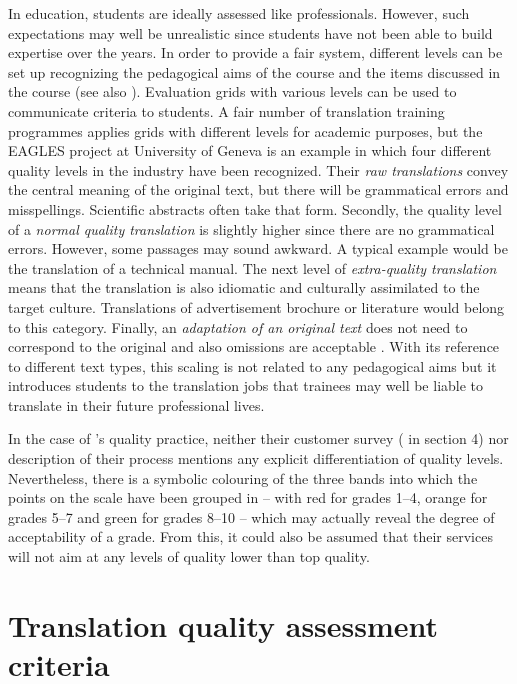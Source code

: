 \documentclass[output=paper]{langsci/langscibook}
\begin{document}
In education, students are ideally assessed like professionals. However, such expectations may well be unrealistic since students have not been able to build expertise over the years. In order to provide a fair system, different levels can be set up recognizing the pedagogical aims of the course and the items discussed in the course (see also \citealt{Vandepitteforthcoming}). Evaluation grids with various levels can be used to communicate criteria to students. A fair number of translation training programmes applies grids with different levels for academic purposes, but the EAGLES project at University of Geneva is an example in which four different quality levels in the industry have been recognized. Their \textit{raw translations} convey the central meaning of the original text, but there will be grammatical errors and misspellings. Scientific abstracts often take that form. Secondly, the quality level of a \textit{normal quality translation} is slightly higher since there are no grammatical errors. However, some passages may sound awkward. A typical example would be the translation of a technical manual. The next level of \textit{extra-quality translation} means that the translation is also idiomatic and culturally assimilated to the target culture. Translations of advertisement brochure or literature would belong to this category. Finally, an \textit{adaptation of an original text} does not need to correspond to the original and also omissions are acceptable \citep{KingEtAl1995}. With its reference to different text types, this scaling is not related to any pedagogical aims but it introduces students to the translation jobs that trainees may well be liable to translate in their future professional lives.



In the case of \citeauthor{SCTA2015}'s quality practice, neither their customer survey ( in section 4) nor description of their  process mentions any explicit differentiation of quality levels. Nevertheless, there is a symbolic colouring of the three bands into which the points on the scale have been grouped in  – with red for grades 1--4, orange for grades 5--7 and green for grades 8--10 – which may actually reveal the degree of acceptability of a grade. From this, it could also be assumed that their services will not aim at any levels of  quality lower than top quality. 


\section{Translation quality assessment criteria}\label{sec:vandepitte:4}
\end{document}
